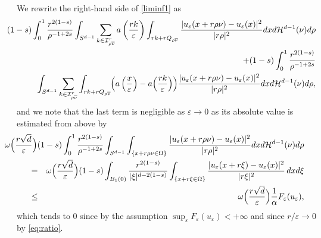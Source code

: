 \documentclass[11pt,a4paper,reqno]{amsart}
\theoremstyle{plain}
\theoremstyle{definition}
\newcommand\e{\varepsilon}
\theoremstyle{remark}
\begin{document}
We rewrite the right-hand side of \eqref{liminf1} as
\begin{eqnarray*}\nonumber &&
    \hskip-0.8cm (1-s) \int_0^1 \frac{r^{2(1-s)}}{\rho^{-1+2s}} \int_{S^{d-1}} \sum_{k\in \mathcal{I}^r_{\rho\overline{\nu}}}  a\left(\frac{rk}{\e}\right) \int_{rk+rQ_{\rho\overline{\nu}}}\frac{|u_\e(x+r\rho\nu)-u_\e(x)|^2}{|r\rho|^2} dxd\mathcal{H}^{d-1}(\nu) d\rho \\  \nonumber 
    && \hskip-1.1cm + (1-s) \int_0^1 \frac{r^{2(1-s)}}{\rho^{-1+2s}}  \\
    &&\int_{S^{d-1}}\sum_{k\in \mathcal{I}^r_{\rho\overline{\nu}}} \int_{rk+rQ_{\rho\overline{\nu}}} {\hskip-0.1cm} \Bigl(a\left(\frac{x}{\e}\right)-a\Bigl(\frac{rk}{\e}\Bigr)\Bigr)\frac{|u_\e(x+r\rho\nu)-u_\e(x)|^2}{|r\rho|^2} dxd\mathcal{H}^{d-1}(\nu) d\rho, 
\end{eqnarray*}
and we note that the last term is negligible as $\e\to0$ as its absolute value is estimated from above by
\begin{eqnarray*}  && \hskip-2cm \omega\Bigl(\frac{r\sqrt{d}}{\e}\Bigr) (1-s) \int_0^1 \frac{r^{2(1-s)}}{\rho^{-1+2s}} \int_{S^{d-1}} \int_{\{x+r\rho\nu \in \Omega\}} \frac{|u_\e(x+r\rho\nu)-u_\e(x)|^2}{|r\rho|^2} dxd\mathcal{H}^{d-1}(\nu) d\rho \\
&=& \omega\Bigl(\frac{r\sqrt{d}}{\e}\Bigr) (1-s) \int_{B_1(0)}\frac{r^{2(1-s)}}{|\xi|^{d-2(1-s)}}\int_{\{x+r\xi \in \Omega\}}\frac{|u_\e(x+r\xi)-u_\e(x)|^2}{|r\xi|^2}\,dx d\xi \\ \nonumber
   &\leq& \omega\Bigl(\frac{r\sqrt{d}}{\e}\Bigr)\frac{1}{\alpha} F_\e(u_\e),
\end{eqnarray*}
which tends to $0$ since by the assumption $\sup_\e F_\e(u_\e) <+\infty$ and since $r/\e\to0$ by \eqref{eq:ratio}.
\end{document}
